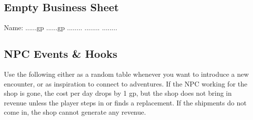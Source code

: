 \documentclass[twocolumn]{dndbook}
\begin{document}










\subsection{Empty Business Sheet}

\begin{DndMonster}[width=.5\textwidth - 8pt]{Name:}
	\hfill ......gp
	\hfill ......gp
	\hfill ........
	\hfill ........
	\hfill ........


\end{DndMonster}


\subsection{NPC Events \& Hooks}


Use the following either as a random table whenever you want to introduce a new encounter, or as inspiration to connect to adventures.
If the NPC working for the shop is gone, the cost per day drops by 1 gp, but the shop does not bring in revenue unless the player steps in or finds a replacement.
If the shipments do not come in, the shop cannot generate any revenue.\par
\end{document}
